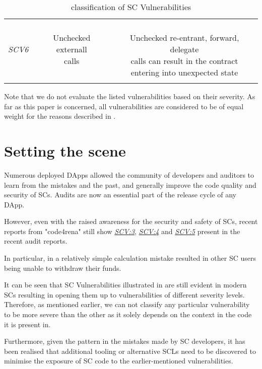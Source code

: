 \documentclass[oneside]{ecsproject}     %
\newcommand{\vref}[1]{\textit{\hyperref[#1]{#1}}}
\begin{document}
\begin{table}[!htb]
\begin{tabular}{ccc}
  \hline
  \textit{SCV6}\label{SCV:6} & \makecell{Unchecked externall\\calls} & \makecell{\\Unchecked re-entrant, forward, delegate\\calls can result in the contract\\entering into unexpected state}\\\\
  \bottomrule
  \end{tabular}
  \caption{classification of SC Vulnerabilities}
  \label{Table:classification}
\end{table}

Note that we do not evaluate the listed vulnerabilities based on their severity. 
As far as this paper is concerned, all vulnerabilities are considered to be of equal weight for the reasons described in .

\newpage
\section{Setting the scene} \label{Section:Scene}

Numerous deployed DApps allowed the community of developers and auditors to learn from the mistakes and the past,
and generally improve the code quality and security of SCs. Audits are now an essential part of the release cycle of any DApp.

However, even with the raised awareness for the security and safety of SCs, recent reports from "code4rena" still show \vref{SCV:3}, \vref{SCV:4} and \vref{SCV:5}
present in the recent audit reports\cite{arcade_report}\cite{ondo_report}\cite{centrifuge_report}.

In particular, in \cite{centrifuge_report} a relatively simple calculation mistake resulted in other SC users being unable to withdraw their funds.

It can be seen that SC Vulnerabilities illustrated in  are still evident in modern SCs resulting in opening them up to vulnerabilities of different severity levels.
Therefore, as mentioned earlier, we can not classify any particular vulnerability to be more severe than the other as it solely depends on the context in the code it is present in.

Furthermore, given the pattern in the mistakes made by SC developers, 
it has been realised that additional tooling or alternative SCLs need to be discovered to minimise the exposure of SC code to the earlier-mentioned vulnerabilities.
\end{document}
